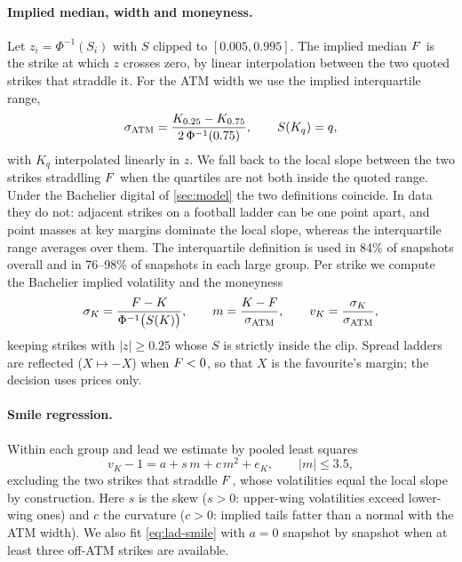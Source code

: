\paragraph{Implied median, width and moneyness.}
Let $z_i=\Phi^{-1}(S_i)$ with $S$ clipped to $[0.005,0.995]$. The implied median $F$ is the
strike at which $z$ crosses zero, by linear interpolation between the two quoted strikes that
straddle it. For the ATM width we use the implied interquartile range,
\begin{equation}\label{eq:lad-satm}
  \sigma_{\mathrm{ATM}}=\frac{K_{0.25}-K_{0.75}}{2\,\Phi^{-1}(0.75)},\qquad S(K_q)=q,
\end{equation}
with $K_q$ interpolated linearly in $z$. We fall back to the local slope between the two strikes
straddling $F$ when the quartiles are not both inside the quoted range. Under the Bachelier
digital of \cref{sec:model} the two definitions coincide. In data they do not: adjacent strikes on
a football ladder can be one point apart, and point masses at key margins dominate the local slope,
whereas the interquartile range averages over them. The interquartile definition is used in 84\%
of snapshots overall and in 76--98\% of snapshots in each large group.
Per strike we compute the Bachelier implied volatility and the moneyness
\begin{equation}\label{eq:lad-sigk}
  \sigma_K=\frac{F-K}{\Phi^{-1}\big(S(K)\big)},\qquad m=\frac{K-F}{\sigma_{\mathrm{ATM}}},\qquad v_K=\frac{\sigma_K}{\sigma_{\mathrm{ATM}}},
\end{equation}
keeping strikes with $|z|\ge0.25$ whose $S$ is strictly inside the clip. Spread ladders are
reflected ($X\mapsto-X$) when $F<0$, so that $X$ is the favourite's margin; the decision uses
prices only.

\paragraph{Smile regression.}
Within each group and lead we estimate by pooled least squares
\begin{equation}\label{eq:lad-smile}
  v_K-1=a+s\,m+c\,m^2+e_K,\qquad |m|\le3.5,
\end{equation}
excluding the two strikes that straddle $F$, whose volatilities equal the local slope by
construction. Here $s$ is the skew ($s>0$: upper-wing volatilities exceed lower-wing ones) and $c$
the curvature ($c>0$: implied tails fatter than a normal with the ATM width). We also fit
\eqref{eq:lad-smile} with $a=0$ snapshot by snapshot when at least three off-ATM strikes are
available.

